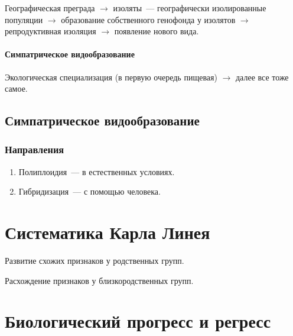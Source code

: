 \documentclass[12pt]{article}
\begin{document}
	Географическая преграда $\rightarrow$ изоляты~--- географически изолированные популяции $\rightarrow$ образование собственного генофонда у изолятов $\rightarrow$ репродуктивная изоляция $\rightarrow$ появление нового вида.
	
	\paragraph{Симпатрическое видообразование}
	
	Экологическая специализация (в первую очередь пищевая) $\rightarrow$ далее все тоже самое.
	
	\subsection{Симпатрическое видообразование}
	
	\subsubsection{Направления}
	
	\begin{enumerate}
		\item Полиплоидия~--- в естественных условиях.
		\item Гибридизация~--- с помощью человека.
	\end{enumerate}
	
	\section{Систематика Карла Линея}
	
	\begin{definition}[Параллелизм]
		Развитие схожих признаков у родственных групп.
	\end{definition}
	
	\begin{definition}[Дивергенция]
		Расхождение признаков у близкородственных групп.
	\end{definition}
	
	\section{Биологический прогресс и регресс}
	
\end{document}
